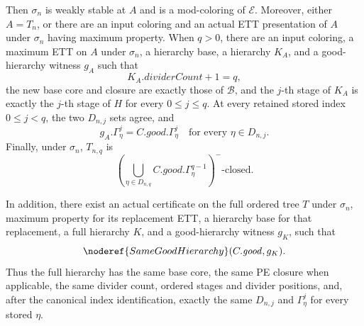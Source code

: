 \begin{lemma}
Then \(\sigma_n\) is weakly stable at \(A\) and is a mod-coloring of
\(\mathcal E\).  Moreover, either \(A=T_n\), or there are an input coloring
and an actual ETT presentation of \(A\) under \(\sigma_n\) having maximum
property.  When \(q>0\), there are an input coloring, a maximum ETT on
\(A\) under \(\sigma_n\), a hierarchy base, a hierarchy \(K_A\), and a
good-hierarchy witness \(g_A\) such that
\[
 K_A.\mathit{dividerCount}+1=q,
\]
the new base core and closure are exactly those of \(\mathcal B\), and the
\(j\)-th stage of \(K_A\) is exactly the \(j\)-th stage of \(H\) for every
\(0\leq j\leq q\).  At every retained stored index \(0\leq j<q\), the two
\(D_{n,j}\) sets agree, and
\[
 g_A.\Gamma^j_\eta=C.\mathit{good}.\Gamma^j_\eta
 \quad\text{for every }\eta\in D_{n,j}.
\]
Finally, under \(\sigma_n\), \(T_{n,q}\) is
\[
 \left(\bigcup_{\eta\in D_{n,q}}
   C.\mathit{good}.\Gamma^{q-1}_\eta\right)^{-}\text{-closed}.
\]

In addition, there exist an actual
 certificate on the full
ordered tree \(T\) under \(\sigma_n\), maximum property for its replacement
ETT, a hierarchy base for that replacement, a full hierarchy \(K\), and a
good-hierarchy witness \(g_K\), such that
\[
              \noderef{SameGoodHierarchy}(C.\mathit{good},g_K).
\]
Thus the full hierarchy has the same base core, the same PE closure when
applicable, the same divider count, ordered stages and divider positions,
and, after the canonical index identification, exactly the same
\(D_{n,j}\) and \(\Gamma^j_\eta\) for every stored \(\eta\).
\end{lemma}
